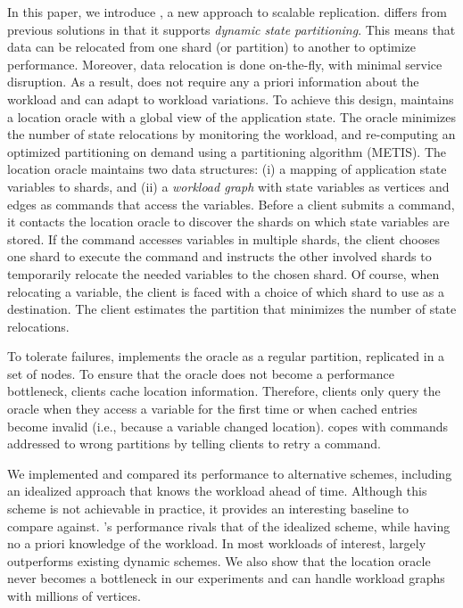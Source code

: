In this paper, we introduce \dynastar, a new approach to scalable replication.
\dynastar differs from previous solutions in that it supports \emph{dynamic state partitioning}.
This means that data can be relocated from one shard (or partition) to another to optimize performance.
Moreover, data relocation is done on-the-fly, with minimal service disruption.
As a result, \dynastar does not require any a priori information about the workload and can adapt to workload variations.
To achieve this design, \dynastar maintains a
location oracle with a global view of the application state.  The oracle minimizes the
number of state relocations by monitoring the workload, and
re-computing an optimized partitioning on demand using a 
partitioning algorithm (METIS).  
The location oracle maintains two data structures: (i) a mapping of application state variables to shards, and (ii) a \emph{workload graph} with state variables as vertices and edges as commands that access the variables.  
Before a client submits a command, it contacts the
location oracle to discover the shards on which state variables are
stored.  If the command accesses variables in multiple shards, the
client chooses one shard to execute the command and instructs the other involved shards to temporarily relocate 
the needed variables to the chosen shard. Of course, when relocating a variable, the client
is faced with a choice of which shard to use as a destination.
The client estimates the partition that minimizes the number of state relocations.

To tolerate failures, \dynastar implements the oracle as a regular partition, replicated in a set of nodes.
To ensure that the oracle does not become a performance bottleneck, clients cache location information.
Therefore, clients only query the oracle when they access a variable for the first time or when cached entries become invalid (i.e., because a variable changed location).
\dynastar copes with commands addressed to wrong partitions by telling clients to retry a command.

We implemented \dynastar and compared its performance to
alternative schemes, including an idealized approach that knows the workload ahead of time.
Although this scheme is not achievable in practice, it provides an interesting baseline to compare against.
\dynastar's performance rivals that of the idealized scheme, while having no a priori knowledge of the workload.
In most workloads of interest, \dynastar largely outperforms existing dynamic schemes.
We also show that the location oracle never becomes a bottleneck in our experiments and can handle workload graphs with millions of vertices.

